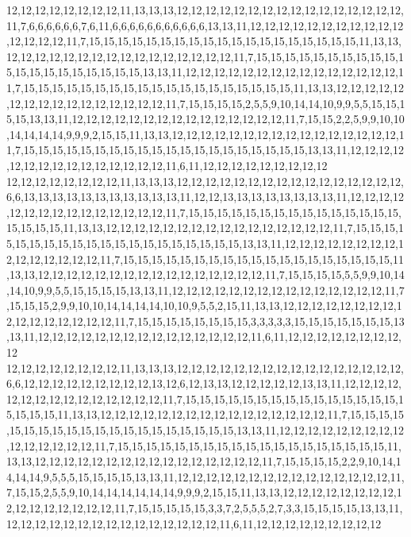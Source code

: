 12,12,12,12,12,12,12,12,11,13,13,13,12,12,12,12,12,12,12,12,12,12,12,12,12,12,12,12,11,7,6,6,6,6,6,6,7,6,11,6,6,6,6,6,6,6,6,6,6,6,13,13,11,12,12,12,12,12,12,12,12,12,12,12,12,12,12,12,11,7,15,15,15,15,15,15,15,15,15,15,15,15,15,15,15,15,15,15,15,11,13,13,12,12,12,12,12,12,12,12,12,12,12,12,12,12,12,12,11,7,15,15,15,15,15,15,15,15,15,15,15,15,15,15,15,15,15,15,15,15,13,13,11,12,12,12,12,12,12,12,12,12,12,12,12,12,12,12,11,7,15,15,15,15,15,15,15,15,15,15,15,15,15,15,15,15,15,15,15,11,13,13,12,12,12,12,12,12,12,12,12,12,12,12,12,12,12,12,11,7,15,15,15,15,2,5,5,9,10,14,14,10,9,9,5,5,15,15,15,15,13,13,11,12,12,12,12,12,12,12,12,12,12,12,12,12,12,12,11,7,15,15,2,2,5,9,9,10,10,14,14,14,14,9,9,9,2,15,15,11,13,13,12,12,12,12,12,12,12,12,12,12,12,12,12,12,12,12,11,7,15,15,15,15,15,15,15,15,15,15,15,15,15,15,15,15,15,15,15,15,13,13,11,12,12,12,12,12,12,12,12,12,12,12,12,12,12,12,11,6,11,12,12,12,12,12,12,12,12,12
12,12,12,12,12,12,12,12,11,13,13,13,12,12,12,12,12,12,12,12,12,12,12,12,12,12,12,12,6,6,13,13,13,13,13,13,13,13,13,13,13,11,12,12,13,13,13,13,13,13,13,13,11,12,12,12,12,12,12,12,12,12,12,12,12,12,12,12,11,7,15,15,15,15,15,15,15,15,15,15,15,15,15,15,15,15,15,15,15,11,13,13,12,12,12,12,12,12,12,12,12,12,12,12,12,12,12,12,11,7,15,15,15,15,15,15,15,15,15,15,15,15,15,15,15,15,15,15,15,15,13,13,11,12,12,12,12,12,12,12,12,12,12,12,12,12,12,12,11,7,15,15,15,15,15,15,15,15,15,15,15,15,15,15,15,15,15,15,15,11,13,13,12,12,12,12,12,12,12,12,12,12,12,12,12,12,12,12,11,7,15,15,15,15,5,5,9,9,10,14,14,10,9,9,5,5,15,15,15,15,13,13,11,12,12,12,12,12,12,12,12,12,12,12,12,12,12,12,11,7,15,15,15,2,9,9,10,10,14,14,14,14,10,10,9,5,5,2,15,11,13,13,12,12,12,12,12,12,12,12,12,12,12,12,12,12,12,12,11,7,15,15,15,15,15,15,15,15,3,3,3,3,3,15,15,15,15,15,15,15,13,13,11,12,12,12,12,12,12,12,12,12,12,12,12,12,12,12,11,6,11,12,12,12,12,12,12,12,12,12
12,12,12,12,12,12,12,12,11,13,13,13,12,12,12,12,12,12,12,12,12,12,12,12,12,12,12,12,6,6,12,12,12,12,12,12,12,12,12,13,12,6,12,13,13,12,12,12,12,12,13,13,11,12,12,12,12,12,12,12,12,12,12,12,12,12,12,12,11,7,15,15,15,15,15,15,15,15,15,15,15,15,15,15,15,15,15,15,15,11,13,13,12,12,12,12,12,12,12,12,12,12,12,12,12,12,12,12,11,7,15,15,15,15,15,15,15,15,15,15,15,15,15,15,15,15,15,15,15,15,13,13,11,12,12,12,12,12,12,12,12,12,12,12,12,12,12,12,11,7,15,15,15,15,15,15,15,15,15,15,15,15,15,15,15,15,15,15,15,11,13,13,12,12,12,12,12,12,12,12,12,12,12,12,12,12,12,12,11,7,15,15,15,15,2,2,9,10,14,14,14,14,9,5,5,5,15,15,15,15,13,13,11,12,12,12,12,12,12,12,12,12,12,12,12,12,12,12,11,7,15,15,2,5,5,9,10,14,14,14,14,14,14,9,9,9,2,15,15,11,13,13,12,12,12,12,12,12,12,12,12,12,12,12,12,12,12,12,11,7,15,15,15,15,15,3,3,7,2,5,5,5,2,7,3,3,15,15,15,15,13,13,11,12,12,12,12,12,12,12,12,12,12,12,12,12,12,12,11,6,11,12,12,12,12,12,12,12,12,12
